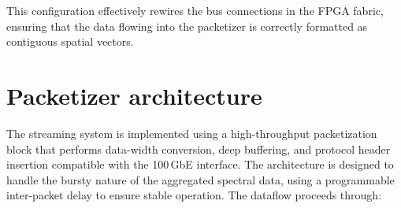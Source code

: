 This configuration effectively rewires the bus connections in the FPGA fabric, ensuring that the data flowing into the packetizer is correctly formatted as contiguous spatial vectors.

\section{Packetizer architecture}

The streaming system is implemented using a high-throughput packetization block that performs data-width conversion, deep buffering, and protocol header insertion compatible with the 100\,GbE interface. The architecture is designed to handle the bursty nature of the aggregated spectral data, using a programmable inter-packet delay to ensure stable operation. The dataflow proceeds through:

